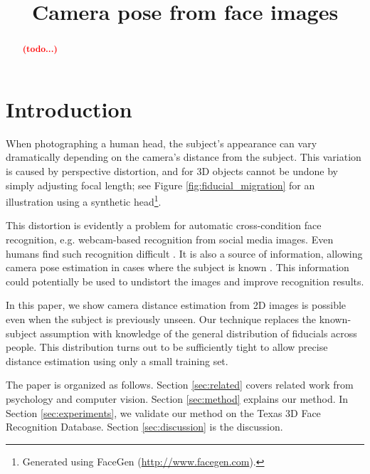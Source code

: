 \documentclass[runningheads]{llncs}
\newcommand {\afbnote} [1] {{\bf \textcolor{red}{(#1)}}}
\begin{document}
\pagestyle{headings}

\mainmatter

\title{Camera pose from face images}


\maketitle

\begin{abstract}
\afbnote{todo...}
\end{abstract}

\section{Introduction}
When photographing a human head, the subject's appearance can vary dramatically depending on the camera's distance from the subject.
This variation is caused by perspective distortion, and for 3D objects cannot be undone by simply adjusting focal length; see Figure \ref{fig:fiducial_migration} for an illustration using a synthetic head\footnote{Generated using FaceGen (\url{http://www.facegen.com}).}.

This distortion is evidently a problem for automatic cross-condition face recognition, e.g. webcam-based recognition from social media images.
Even humans find such recognition difficult \cite{liu2003face,liu2006face}.
It is also a source of information, allowing camera pose estimation in cases where the subject is known \cite{ohayon2006robust}.
This information could potentially be used to undistort the images and improve recognition results.

In this paper, we show camera distance estimation from 2D images is possible even when the subject is previously unseen.
Our technique replaces the known-subject assumption with knowledge of the general distribution of fiducials across people.
This distribution turns out to be sufficiently tight to allow precise distance estimation using only a small training set.

The paper is organized as follows.
Section \ref{sec:related} covers related work from psychology and computer vision.
Section \ref{sec:method} explains our method.
In Section \ref{sec:experiments}, we validate our method on the Texas 3D Face Recognition Database.
Section \ref{sec:discussion} is the discussion.
\end{document}
